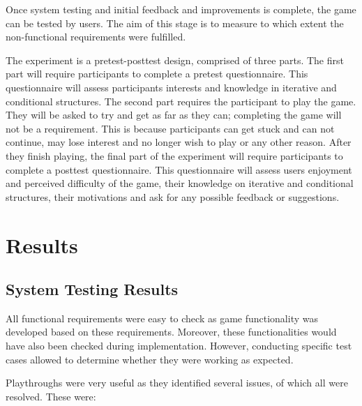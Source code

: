 \documentclass[a4paper,11.5pt]{report}
\numberwithin{figure}{section}
\numberwithin{table}{section}
\numberwithin{equation}{section}
\numberwithin{equation}{section}
\newcommand\blankpage{%
    \null
    \thispagestyle{empty}%
    \addtocounter{page}{-1}%
    \newpage}
\begin{document}
Once system testing and initial feedback and improvements is complete, the game can be tested by users. The aim of this stage is to measure to which extent the non-functional requirements were fulfilled.

The experiment is a pretest-posttest design, comprised of three parts. The first part will require participants to complete a pretest questionnaire. This questionnaire will assess participants interests and knowledge in iterative and conditional structures. The second part requires the participant to play the game. They will be asked to try and get as far as they can; completing the game will not be a requirement. This is because participants can get stuck and can not continue, may lose interest and no longer wish to play or any other reason. After they finish playing, the final part of the experiment will require participants to complete a posttest questionnaire. This questionnaire will assess users enjoyment and perceived difficulty of the game, their knowledge on iterative and conditional structures, their motivations and ask for any possible feedback or suggestions.






\afterpage{\blankpage}


\chapter{Results}

\section{System Testing Results}

All functional requirements were easy to check as game functionality was developed based on these requirements. Moreover, these functionalities would have also been checked during implementation. However, conducting specific test cases allowed to determine whether they were working as expected.

Playthroughs were very useful as they identified several issues, of which all were resolved. These were:
\end{document}
